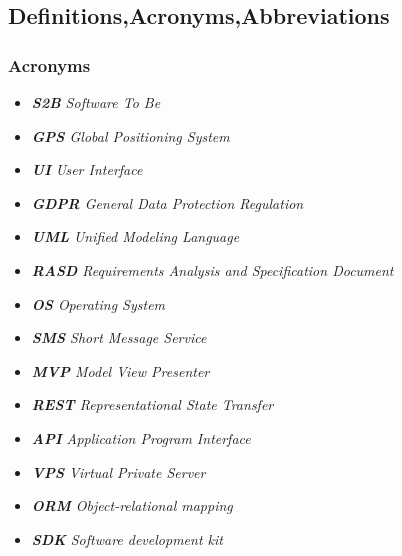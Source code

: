 \subsection{Definitions,Acronyms,Abbreviations}

\subsubsection{Acronyms}
\begin{itemize}
\item[] \emph{\textbf{S2B} Software To Be}
\item[] \emph{\textbf{GPS} Global Positioning System}
\item[] \emph{\textbf{UI} User Interface}
\item[] \emph{\textbf{GDPR} General Data Protection Regulation}
\item[] \emph{\textbf{UML} Unified Modeling Language}
\item[] \emph{\textbf{RASD} Requirements Analysis and Specification Document}
\item[] \emph{\textbf{OS} Operating System}
\item[] \emph{\textbf{SMS} Short Message Service}
\item[] \emph{\textbf{MVP} Model View Presenter}
\item[] \emph{\textbf{REST} Representational State Transfer}
\item[] \emph{\textbf{API} Application Program Interface}
\item[] \emph{\textbf{VPS} Virtual Private Server}
\item[] \emph{\textbf{ORM} Object-relational mapping}
\item[] \emph{\textbf{SDK} Software development kit}
\end{itemize}
